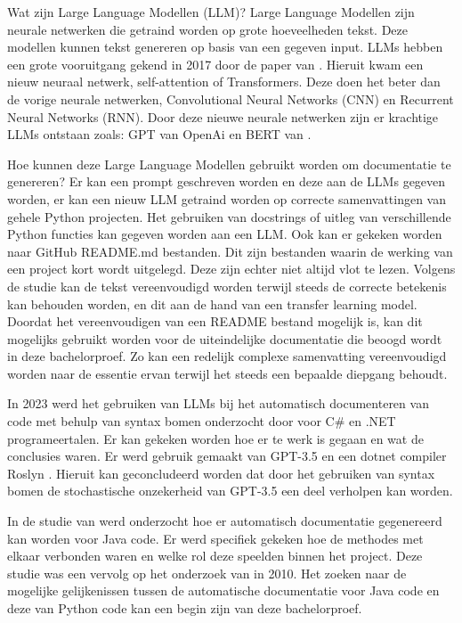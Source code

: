 Wat zijn Large Language Modellen (LLM)?
Large Language Modellen zijn neurale netwerken die getraind worden op grote hoeveelheden tekst. 
Deze modellen kunnen tekst genereren op basis van een gegeven input. 
LLMs hebben een grote vooruitgang gekend in 2017 door de paper van \textcite{VaswaniEtAl2017}. 
Hieruit kwam een nieuw neuraal netwerk, self-attention of Transformers. 
Deze doen het beter dan de vorige neurale netwerken, Convolutional Neural Networks (CNN) en Recurrent Neural Networks (RNN).
Door deze nieuwe neurale netwerken zijn er krachtige LLMs ontstaan zoals: GPT van OpenAi  \autocite{RandfordEtAL2018} en BERT van \textcite{DevlinEtAl2019}.

Hoe kunnen deze Large Language Modellen gebruikt worden om documentatie te genereren?
Er kan een prompt geschreven worden en deze aan de LLMs gegeven worden, er kan een nieuw LLM getraind worden op correcte samenvattingen van gehele Python projecten.
Het gebruiken van docstrings of uitleg van verschillende Python functies kan gegeven worden aan een LLM. 
Ook kan er gekeken worden naar GitHub README.md bestanden. Dit zijn bestanden waarin de werking van een project kort wordt uitgelegd. Deze zijn echter niet altijd vlot te lezen. 
Volgens de studie \textcite{GaoEtAl2023} kan de tekst vereenvoudigd worden terwijl steeds de correcte betekenis kan behouden worden, en dit aan de hand van een transfer learning model.
Doordat het vereenvoudigen van een README bestand mogelijk is, kan dit mogelijks gebruikt worden voor de uiteindelijke documentatie die beoogd wordt in deze bachelorproef. 
Zo kan een redelijk complexe samenvatting vereenvoudigd worden naar de essentie ervan terwijl het steeds een bepaalde diepgang behoudt. 

In 2023 werd het gebruiken van LLMs bij het automatisch documenteren van code met behulp van syntax bomen onderzocht door \textcite{Procko2023} voor C\# en .NET programeertalen.
Er kan gekeken worden hoe er te werk is gegaan en wat de conclusies waren. Er werd gebruik gemaakt van GPT-3.5 en een dotnet compiler Roslyn \autocite{Roslyn}. 
Hieruit kan geconcludeerd worden dat door het gebruiken van syntax bomen de stochastische onzekerheid van GPT-3.5 een deel verholpen kan worden. 

In de studie van \textcite{McBurneyMcMillan2014} werd onderzocht hoe er automatisch documentatie gegenereerd kan worden voor Java code. 
Er werd specifiek gekeken hoe de methodes met elkaar verbonden waren en welke rol deze speelden binnen het project.
Deze studie was een vervolg op het onderzoek van \textcite{SridharaEtAL2010} in 2010.
Het zoeken naar de mogelijke gelijkenissen tussen de automatische documentatie voor Java code en deze van Python code kan een begin zijn van deze bachelorproef. 

